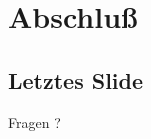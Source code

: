 \section{Abschluß}

\subsection{Letztes Slide}

\frame
{
   \Huge
   \begin{center}
   Fragen ?
   \end{center}
   \normalsize
}

